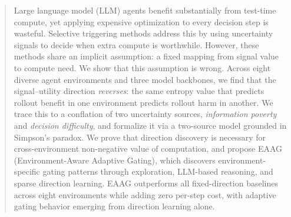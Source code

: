 \begin{abstract}
Large language model (LLM) agents benefit substantially from
test-time compute, yet applying expensive optimization to every
decision step is wasteful. Selective triggering methods address this by using uncertainty
signals to decide when extra compute is worthwhile. However, these
methods share an implicit assumption: a fixed mapping from signal
value to compute need. We show that this assumption is wrong. Across eight diverse
agent environments and three model backbones, we find that the
signal--utility direction \emph{reverses}: the same entropy value
that predicts rollout benefit in one environment predicts rollout
harm in another. We trace this to a conflation of two uncertainty
sources, \emph{information poverty} and \emph{decision difficulty},
and formalize it via a two-source model grounded in Simpson's
paradox. We prove that direction discovery is necessary for
cross-environment non-negative value of computation, and propose EAAG
(Environment-Aware Adaptive Gating), which discovers
environment-specific gating patterns through exploration, LLM-based
reasoning, and sparse direction learning. EAAG outperforms all
fixed-direction baselines across eight environments while adding zero
per-step cost, with adaptive gating behavior emerging from direction
learning alone.
\end{abstract}
